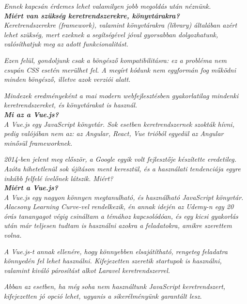 \textit{Ennek kapcsán érdemes lehet valamilyen jobb megoldás után néznünk.}\\

\noindent\textit{\textbf{Miért van szükség keretrendszerekre, könyvtárakra?}}\\

\textit{Keretrendszerekre (framework), valamint könyvtárakra (library) általában azért lehet szükség, mert ezeknek a segítségével jóval gyorsabban dolgozhatunk, valósíthatjuk meg az adott funkcionalitást.}

\textit{Ezen felül, gondoljunk csak a böngésző kompatibilitásra: ez a probléma nem csupán CSS esetén merülhet fel. A megírt kódunk nem egyformán fog működni minden böngésző, illetve azok verziói alatt.}

\textit{Mindezek eredményeként a mai modern webfejlesztésben gyakorlatilag mindenki keretrendszereket, és könyvtárakat is használ.}\\

\noindent\textit{\textbf{Mi az a Vue.js?}}\\

\textit{A Vue.js egy JavaScript könyvtár. Sok esetben keretrendszernek szokták hívni, pedig valójában nem az: az Angular, React, Vue trióból egyedül az Angular minősül frameworknek.}

\textit{2014-ben jelent meg először, a Google egyik volt fejlesztője készítette eredetileg. Azóta hihetetlenül sok újításon ment keresztül, és a használati tendenciája egyre inkább felfelé ívelőnek látszik. Miért?}\\

\noindent\textit{\textbf{Miért a Vue.js?}}\\

\textit{A Vue.js egy nagyon könnyen megtanulható, és használható JavaScript könyvtár. Alacsony Learning Curve-vel rendelkezik, én annak idején az Udemy-n egy 20 órás tananyagot végig csináltam a témához kapcsolódóan, és egy kicsi gyakorlás után már teljesen tudtam is használni azokra a feladatokra, amikre szerettem volna.}

\textit{A Vue.js-t annak ellenére, hogy könnyebben elsajátítható, rengeteg feladatra könnyedén fel lehet használni. Kifejezetten szeretik startupok is használni, valamint kiváló párosítást alkot Laravel keretrendszerrel.}

\textit{Abban az esetben, ha még soha nem használtunk JavaScript keretrendszert, kifejezetten jó opció lehet, ugyanis a sikerélményünk garantált lesz.}\\


